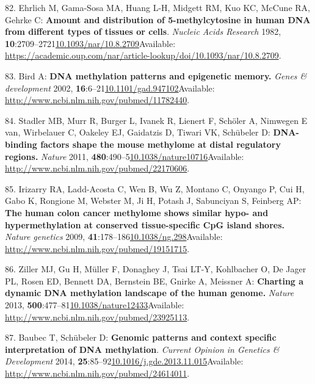 \documentclass[
]{book}
\begin{document}
\leavevmode\hypertarget{ref-Ehrlich1982}{}%
82. Ehrlich M, Gama-Sosa MA, Huang L-H, Midgett RM, Kuo KC, McCune RA, Gehrke C: \textbf{Amount and distribution of 5-methylcytosine in human DNA from different types of tissues or cells}. \emph{Nucleic Acids Research} 1982, \textbf{10}:2709--2721\href{https://doi.org/10.1093/nar/10.8.2709}{10.1093/nar/10.8.2709}Available: \url{https://academic.oup.com/nar/article-lookup/doi/10.1093/nar/10.8.2709}.

\leavevmode\hypertarget{ref-Bird2002}{}%
83. Bird A: \textbf{DNA methylation patterns and epigenetic memory.} \emph{Genes \& development} 2002, \textbf{16}:6--21\href{https://doi.org/10.1101/gad.947102}{10.1101/gad.947102}Available: \url{http://www.ncbi.nlm.nih.gov/pubmed/11782440}.

\leavevmode\hypertarget{ref-Stadler2011}{}%
84. Stadler MB, Murr R, Burger L, Ivanek R, Lienert F, Schöler A, Nimwegen E van, Wirbelauer C, Oakeley EJ, Gaidatzis D, Tiwari VK, Schübeler D: \textbf{DNA-binding factors shape the mouse methylome at distal regulatory regions.} \emph{Nature} 2011, \textbf{480}:490--5\href{https://doi.org/10.1038/nature10716}{10.1038/nature10716}Available: \url{http://www.ncbi.nlm.nih.gov/pubmed/22170606}.

\leavevmode\hypertarget{ref-Irizarry2009}{}%
85. Irizarry RA, Ladd-Acosta C, Wen B, Wu Z, Montano C, Onyango P, Cui H, Gabo K, Rongione M, Webster M, Ji H, Potash J, Sabunciyan S, Feinberg AP: \textbf{The human colon cancer methylome shows similar hypo- and hypermethylation at conserved tissue-specific CpG island shores.} \emph{Nature genetics} 2009, \textbf{41}:178--186\href{https://doi.org/10.1038/ng.298}{10.1038/ng.298}Available: \url{http://www.ncbi.nlm.nih.gov/pubmed/19151715}.

\leavevmode\hypertarget{ref-Ziller2013}{}%
86. Ziller MJ, Gu H, Müller F, Donaghey J, Tsai LT-Y, Kohlbacher O, De Jager PL, Rosen ED, Bennett DA, Bernstein BE, Gnirke A, Meissner A: \textbf{Charting a dynamic DNA methylation landscape of the human genome.} \emph{Nature} 2013, \textbf{500}:477--81\href{https://doi.org/10.1038/nature12433}{10.1038/nature12433}Available: \url{http://www.ncbi.nlm.nih.gov/pubmed/23925113}.

\leavevmode\hypertarget{ref-Baubec2014}{}%
87. Baubec T, Schübeler D: \textbf{Genomic patterns and context specific interpretation of DNA methylation}. \emph{Current Opinion in Genetics \& Development} 2014, \textbf{25}:85--92\href{https://doi.org/10.1016/j.gde.2013.11.015}{10.1016/j.gde.2013.11.015}Available: \url{http://www.ncbi.nlm.nih.gov/pubmed/24614011}.
\end{document}
